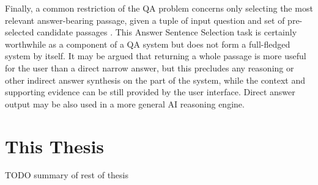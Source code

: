 Finally, a common restriction of the QA problem concerns only selecting
the most relevant answer-bearing passage, given a tuple of input question
and set of pre-selected candidate passages \cite{WangQAGrammar}.
This Answer Sentence Selection task is certainly
worthwhile as a component of a QA system but does not form a full-fledged
system by itself.
It may be argued that returning a whole passage is more useful for the user than a direct narrow answer,
but this precludes any reasoning or other indirect answer synthesis on the part of the system,
while the context and supporting evidence can be still provided by the user interface.
Direct answer output may be also used in a more general AI reasoning engine.

\section{This Thesis}

TODO summary of rest of thesis
